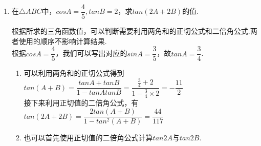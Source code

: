 \begin{enumerate}
    \begin{enumerate}
        \item $2cos^2\theta+2sin\theta cos\theta - 1 = \sqrt{2}sin(2\theta+\dfrac{\pi}{4})$
        \item $\dfrac{1+sin2\theta+cos2\theta}{1+sin2\theta-cos2\theta} = cot\theta$
    \end{enumerate}
    \begin{jieda}
        证明：
        \begin{enumerate}
            \item 等式左边根据二倍角公式可以变换为$sin2\theta + cos2\theta$ \\
            再利用合一公式可以变化得到右边$sin2\theta + cos2\theta = \sqrt{2}sin(2\theta+\dfrac{\pi}{4})$
            \item 首先进行常数1的代换$1 = sin^2\theta + cos^2\theta$，在此基础上结合二倍角公式配方有$1+sin2\theta = (sin\theta+cos\theta)^2$.\\
            因此左侧可以化为$\dfrac{(sin\theta+cos\theta)^2 - sin^2\theta + cos^2\theta}{(sin\theta+cos\theta)^2 - cos^2\theta + sin^2\theta}$\\
            进一步利用平方差公式可以化为$\dfrac{(2sin\theta+cos\theta)(cos\theta)+cos^2\theta}{(sin\theta+2cos\theta)(sin\theta)+sin^2\theta}$ \\
            合并同类项后可以化为$\dfrac{(2sin\theta+2cos\theta)(cos\theta)}{(2sin\theta+2cos\theta)(sin\theta)}$ \\
            化简后即为右侧$cot\theta$
        \end{enumerate}
    \end{jieda}
    \item 在$\triangle ABC$中，$cosA = \dfrac{4}{5}, tanB = 2$，求$tan(2A+2B)$的值.
    \begin{jieda}
        根据所求的三角函数值，可以判断需要利用两角和的正切公式和二倍角公式.两者使用的顺序不影响计算结果.\\
        根据$cosA = \dfrac{4}{5}$，我们可以写出对应的$sinA = \dfrac{3}{5}$，故$tanA = \dfrac{3}{4}$.
        \begin{enumerate}
            \item 可以利用两角和的正切公式得到$tan(A+B) = \dfrac{tanA+tanB}{1-tanAtanB} = \dfrac{\frac{3}{4}+2}{1-\frac{3}{4}\times2} = -\dfrac{11}{2}$ \\
            接下来利用正切值的二倍角公式，有$tan(2A+2B) = \dfrac{2tan(A+B)}{1 - tan^2(A+B)} = \dfrac{44}{117}$
            \item 也可以首先使用正切值的二倍角公式计算$tan2A$与$tan2B$.\\

\end{enumerate}
\end{jieda}
\end{enumerate}
